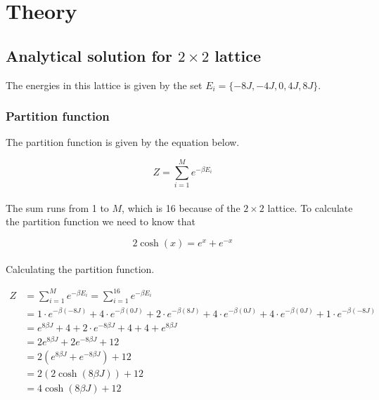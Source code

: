 \documentclass{article}
\begin{document}
\vspace{1cm}

\section{Theory} \label{sec:Theory}

\subsection{Analytical solution for \texorpdfstring{ $2 \times 2$ }{text} lattice}

The energies in this lattice is given by the set $E_i = \{- 8 J, -4J, 0 , 4J, 8J \}$.

\subsubsection{Partition function}

The partition function is given by the equation below.

\begin{equation} \label{eq:partitionfunction}
    Z = \sum_{i=1} ^{M} e^{- \beta E_i}
\end{equation} \\

The sum runs from 1 to $M$, which is 16 because of the $ 2 \times 2 $ lattice. To calculate the partition function we need to know that

\begin{equation*}
    2 \cosh (x) = e^x + e^{-x}
\end{equation*} \\

Calculating the partition function.

\begin{align*}
  Z &= \sum_{i=1} ^{M} e^{- \beta E_i} = \sum_{i=1} ^{16} e^{- \beta E_i} \\
  &= 1 \cdot e^{- \beta (-8J)} + 4 \cdot e^{- \beta (0J)} + 2 \cdot e^{- \beta (8J)} + 4 \cdot e^{- \beta (0J)}
  + 4 \cdot e^{- \beta (0J)} + 1 \cdot e^{- \beta (-8J)} \\
  &= e^{8 \beta J} + 4 + 2 \cdot e^{-8 \beta J} + 4 + 4 + e^{8 \beta J} \\
  &= 2 e^{8 \beta J } + 2 e^{-8 \beta J} + 12 \\
  &= 2 \left( e^{8 \beta J} + e^{- 8 \beta J} \right) + 12 \\
  &= 2 \left( 2 \cosh(8 \beta J) \right) + 12 \\
  &= 4 \cosh(8 \beta J) + 12
\end{align*} \\
\end{document}
